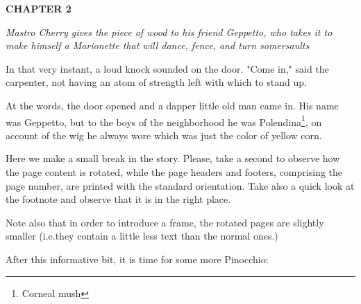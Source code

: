 \documentclass[12pt,twoside]{article}
\begin{document}
\bigskip
{\slshape%

  \textbf{CHAPTER 2}

  \emph{Mastro Cherry gives the piece of wood to his friend Geppetto,
    who takes it to make himself a Marionette that will dance,
    fence, and turn somersaults}
  \medskip
  
  In that very instant, a loud knock sounded on the door.
  "Come in," said the carpenter, not having an atom of
  strength left with which to stand up.
  
  At the words, the door opened and a dapper little old man came in.
  His name was Geppetto, but to the boys of the neighborhood he was
  Polendina\footnote{Corneal mush}, on account of the wig he always
  wore which was just the color of yellow corn.
  
}

\bigbreak

Here we make a small break in the story. Please, take a second to
observe how the page content is rotated, while the page headers and
footers, comprising the page number, are printed with the standard
orientation. Take also a quick look at the footnote and observe that
it is in the right place.

Note also that in order to introduce a frame, the rotated pages are
slightly smaller (i.e.\@ they contain a little less text than the
normal ones.)  

After this informative bit, it is time for some more Pinocchio:
\end{document}
